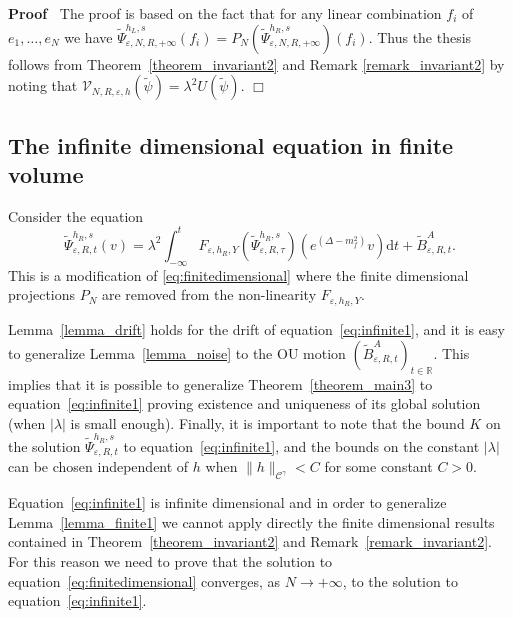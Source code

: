 \documentclass{article}
\newcommand{\mathd}{\mathrm{d}}
\newenvironment{proof}{\noindent\textbf{Proof\ }}{\hspace*{\fill}$\Box$\medskip}
\begin{document}
\begin{proof}
  The proof is based on the fact that for any linear combination $f_i$ of
  $e_1, \ldots, e_N$ we have $\tilde{\Psi}_{\varepsilon, N, R, + \infty}^{h_L,
  s} (f_i) = P_N (\tilde{\Psi}_{\varepsilon, N, R, + \infty}^{h_R, s}) (f_i)$.
  Thus the thesis follows from Theorem~\ref{theorem_invariant2} and Remark
  \ref{remark_invariant2} by noting that $\mathcal{V}_{N, R, \varepsilon, h}
  (\tilde{\psi}) = \lambda^2 U (\tilde{\psi})$.
\end{proof}

\subsection{The infinite dimensional equation in finite volume}

Consider the equation
\begin{equation}
  \tilde{\Psi}_{\varepsilon, R, t}^{h_R, s} (v) = \lambda^2 \int_{- \infty}^t
  F_{\varepsilon, h_R, Y} (\tilde{\Psi}_{\varepsilon, R, \tau}^{h_R, s})
  (e^{(\Delta - m^2_f)} v) \mathd t + \tilde{B}^A_{\varepsilon, R, t}
  \label{eq:infinite1} .
\end{equation}
This is a modification of {\eqref{eq:finitedimensional}} where the finite
dimensional projections $P_N$ are removed from the non-linearity
$F_{\varepsilon, h_R, Y}$.

\begin{remark}
  Lemma~\ref{lemma_drift} holds for the drift of
  equation~{\eqref{eq:infinite1}}, and it is easy to generalize
  Lemma~\ref{lemma_noise} to the OU motion $(\tilde{B}_{\varepsilon, R,
  t}^A)_{t \in \mathbb{R}}$. This implies that it is possible to generalize
  Theorem~\ref{theorem_main3} to equation~{\eqref{eq:infinite1}} proving
  existence and uniqueness of its global solution (when $| \lambda |$ is small
  enough). Finally, it is important to note that the bound $K$ on the solution
  $\tilde{\Psi}_{\varepsilon, R, t}^{h_R, s}$ to
  equation~{\eqref{eq:infinite1}}, and the bounds on the constant $| \lambda
  |$ can be chosen independent of $h$ when $\| h \|_{\mathcal{C}^{\gamma}} <
  C$ for some constant $C > 0$.
\end{remark}

Equation~{\eqref{eq:infinite1}} is infinite dimensional and in order to
generalize Lemma~\ref{lemma_finite1} we cannot apply directly the finite
dimensional results contained in Theorem~\ref{theorem_invariant2} and
Remark~\ref{remark_invariant2}. For this reason we need to prove that the
solution to equation~{\eqref{eq:finitedimensional}} converges, as $N
\rightarrow + \infty$, to the solution to equation~{\eqref{eq:infinite1}}.
\end{document}
